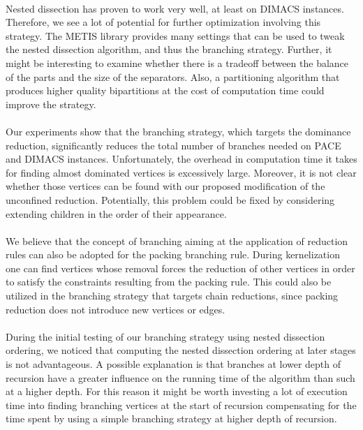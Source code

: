 \documentclass[]{article}
\begin{document}
\paragraph{}
Nested dissection has proven to work very well, at least on DIMACS instances. Therefore, we see a lot of potential for further optimization involving this strategy. The METIS library provides many settings that can be used to tweak the nested dissection algorithm, and thus the branching strategy. Further, it might be interesting to examine whether there is a tradeoff between the balance of the parts and the size of the separators. Also, a partitioning algorithm that produces higher quality bipartitions at the cost of computation time could improve the strategy. 

\paragraph{}
Our experiments show that the branching strategy, which targets the dominance reduction, significantly reduces the total number of branches needed on PACE and DIMACS instances. Unfortunately, the overhead in computation time it takes for finding almost dominated vertices is excessively large. Moreover, it is not clear whether those vertices can be found with our proposed modification of the unconfined reduction. Potentially, this problem could be fixed by considering extending children in the order of their appearance.

\paragraph{}
We believe that the concept of branching aiming at the application of reduction rules can also be adopted for the packing branching rule. During kernelization one can find vertices whose removal forces the reduction of other vertices in order to satisfy the constraints resulting from the packing rule. This could also be utilized in the branching strategy that targets chain reductions, since packing reduction does not introduce new vertices or edges. 

\paragraph{}
During the initial testing of our branching strategy using nested dissection ordering, we noticed that computing the nested dissection ordering at later stages is not advantageous. A possible explanation is that branches at lower depth of recursion have a greater influence on the running time of the algorithm than such at a higher depth. For this reason it might be worth investing a lot of execution time into finding branching vertices at the start of recursion compensating for the time spent by using a simple branching strategy at higher depth of recursion.

\newpage


\end{document}
